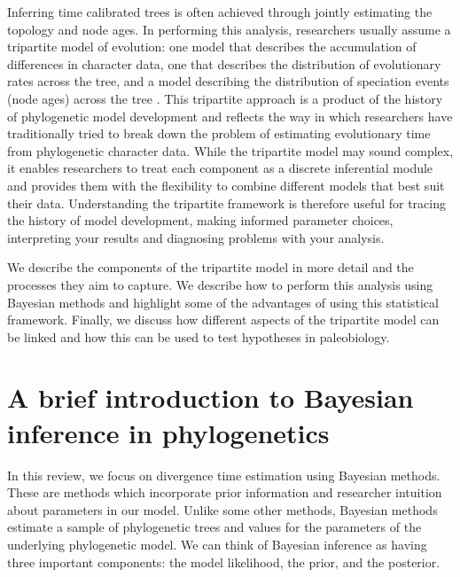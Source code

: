 Inferring time calibrated trees is often achieved through jointly estimating the topology and node ages.
In performing this analysis, researchers usually assume a tripartite model of evolution: one model that describes the accumulation of differences in character data, one that describes the distribution of evolutionary rates across the tree, and a model describing the distribution of speciation events (node ages) across the tree \citep{Thorne1998,Kishino2001,Yang2006,Drummond2006}.
This tripartite approach is a product of the history of phylogenetic model development and reflects the way in which researchers have traditionally tried to break down the problem of estimating evolutionary time from phylogenetic character data.
While the tripartite model may sound complex, it enables researchers to treat each component as a discrete inferential module and provides them with the flexibility to combine different models that best suit their data.
Understanding the tripartite framework is therefore useful for tracing the history of model development, making informed parameter choices, interpreting your results and diagnosing problems with your analysis.

We describe the components of the tripartite model in more detail and the processes they aim to capture.
We describe how to perform this analysis using Bayesian methods and highlight some of the advantages of using this statistical framework.
Finally, we discuss how different aspects of the tripartite model can be linked and how this can be used to test hypotheses in paleobiology.


\section{A brief introduction to Bayesian inference in phylogenetics}

In this review, we focus on divergence time estimation using Bayesian methods. 
These are methods which incorporate prior information and researcher intuition about parameters in our model.
Unlike some other methods, Bayesian methods estimate a sample of phylogenetic trees and values for the parameters of the underlying phylogenetic model.
We can think of Bayesian inference as having three important components: the model likelihood, the prior, and the posterior.

